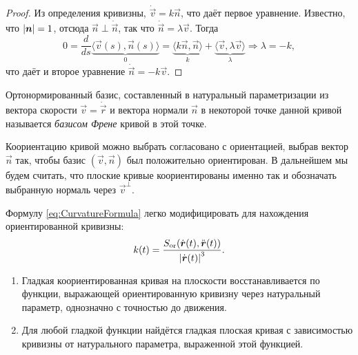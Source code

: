 \begin{proof}
	Из определения кривизны, $\dot{\vec{v}} = k\vec{n}$, что даёт первое уравнение. Известно, что $\left\lvert\boldsymbol{n}\right\rvert = 1$, отсюда $\vec{n} \perp \dot{\vec{n}}$, так что $\dot{\vec{n}} = \lambda\vec{v}$. Тогда
	\[
		0 = \frac{d}{ds}\underbrace{\langle \vec{v}(s), \vec{n}(s)\rangle}_{0} = \underbrace{\langle k\vec{n}, \vec{n}\rangle}_{k} + \underbrace{\langle \vec{v}, \lambda\vec{v} \rangle}_{\lambda} \Rightarrow \lambda = -k,
	\]
	что даёт и второе уравнение $\dot{\vec{n}} = -k\vec{v}$.
\end{proof}

\begin{definition}
	Ортонормированный базис, составленный в натуральный параметризации из вектора скорости $\vec{v} = \dot{\vec{r}}$ и вектора нормали $\vec{n}$ в некоторой точке данной кривой называется \textit{базисом Френе} кривой в этой точке.
\end{definition}

Коориентацию кривой можно выбрать согласовано с ориентацией, выбрав вектор $\vec{n}$ так, чтобы базис $(\vec{v}, \vec{n})$ был положительно ориентирован. В дальнейшем мы будем считать, что плоские кривые коориентированы именно так и обозначать выбранную нормаль через $\vec{v}^{\perp}$.

Формулу \eqref{eq:CurvatureFormula} легко модифицировать для нахождения ориентированной кривизны:
\begin{equation} \label{eq:OrientedCurvature}
	k(t) = \frac{S_{\mathrm{or}}(\dot{\boldsymbol{r}}(t), \ddot{\boldsymbol{r}}(t))}{\left\lvert\dot{\boldsymbol{r}}(t)\right\rvert^3}.
\end{equation}

\begin{theorem} \label{theorem:FundamentalPlaneCurves}
	\begin{enumerate}[nolistsep, label=(\arabic*)]
		\item Гладкая коориентированная кривая на плоскости восстанавливается по функции, выражающей ориентированную кривизну через натуральный параметр, однозначно с точностью до движения.
		\item Для любой гладкой функции найдётся гладкая плоская кривая с зависимостью кривизны от натурального параметра, выраженной этой функцией.
	\end{enumerate}
\end{theorem}

